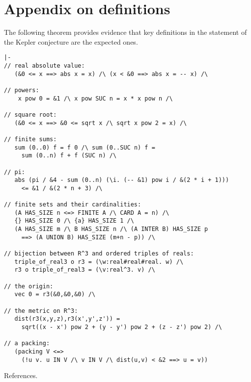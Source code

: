 \newpage
\section{Appendix on definitions}

The following theorem provides evidence that key definitions in the statement of the Kepler conjecture
are the expected ones.

\begin{obeylines}

\begin{verbatim}
|-  
// real absolute value:
   (&0 <= x ==> abs x = x) /\ (x < &0 ==> abs x = -- x) /\   

// powers:
    x pow 0 = &1 /\ x pow SUC n = x * x pow n /\

// square root:
   (&0 <= x ==> &0 <= sqrt x /\ sqrt x pow 2 = x) /\ 

// finite sums:
   sum (0..0) f = f 0 /\ sum (0..SUC n) f =  
     sum (0..n) f + f (SUC n) /\ 

// pi:
   abs (pi / &4 - sum (0..n) (\i. (-- &1) pow i / &(2 * i + 1))) 
     <= &1 / &(2 * n + 3) /\

// finite sets and their cardinalities:
   (A HAS_SIZE n <=> FINITE A /\ CARD A = n) /\
   {} HAS_SIZE 0 /\ {a} HAS_SIZE 1 /\ 
   (A HAS_SIZE m /\ B HAS_SIZE n /\ (A INTER B) HAS_SIZE p 
     ==> (A UNION B) HAS_SIZE (m+n - p)) /\

// bijection between R^3 and ordered triples of reals:
   triple_of_real3 o r3 = (\w:real#real#real. w) /\
   r3 o triple_of_real3 = (\v:real^3. v) /\ 

// the origin:
   vec 0 = r3(&0,&0,&0) /\

// the metric on R^3:
   dist(r3(x,y,z),r3(x',y',z')) = 
     sqrt((x - x') pow 2 + (y - y') pow 2 + (z - z') pow 2) /\

// a packing:
   (packing V <=> 
     (!u v. u IN V /\ v IN V /\ dist(u,v) < &2 ==> u = v))
\end{verbatim}

\end{obeylines}



References.